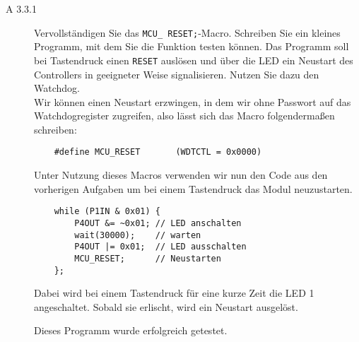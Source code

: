 \documentclass[11pt,a4paper,ngerman]{article}
\begin{document}
\begin{description}
	\item[A 3.3.1] Vervollständigen Sie das \texttt{MCU\_ RESET;}-Macro. Schreiben Sie ein kleines Programm, mit dem Sie die Funktion testen können. Das Programm soll bei Tastendruck einen \texttt{RESET} auslösen und über die LED ein Neustart des Controllers in geeigneter Weise signalisieren. Nutzen Sie dazu den Watchdog. \\
	
	Wir können einen Neustart erzwingen, in dem wir ohne Passwort auf das Watchdogregister zugreifen, also lässt sich das Macro folgendermaßen schreiben:
	\begin{lstlisting}
	#define MCU_RESET 		(WDTCTL = 0x0000)
	\end{lstlisting}
	
	Unter Nutzung dieses Macros verwenden wir nun den Code aus den vorherigen Aufgaben um bei einem Tastendruck das Modul neuzustarten.
	\begin{lstlisting}
	while (P1IN & 0x01) {
		P4OUT &= ~0x01; // LED anschalten
		wait(30000);    // warten
		P4OUT |= 0x01;  // LED ausschalten
		MCU_RESET;      // Neustarten
	};
	\end{lstlisting}
	Dabei wird bei einem Tastendruck für eine kurze Zeit die LED 1 angeschaltet. Sobald sie erlischt, wird ein Neustart ausgelöst.
	
	Dieses Programm wurde erfolgreich getestet.
	
\end{description}
\label{LastPage}
\end{document}
